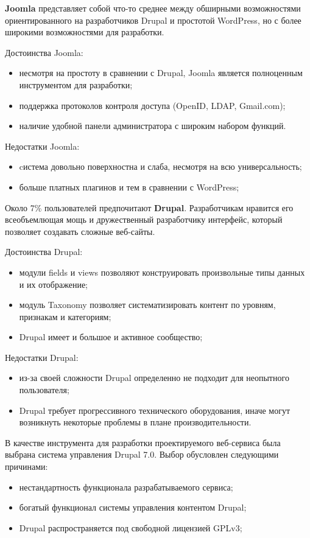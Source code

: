 \textbf{Joomla} представляет собой что-то среднее между обширными возможностями ориентированного на
разработчиков Drupal и простотой WordPress, но с более широкими возможностями для разработки.

Достоинства Joomla:
\begin{itemize}
\item
  несмотря на простоту в сравнении с Drupal, Joomla является полноценным инструментом для разработки;
\item
  поддержка протоколов контроля доступа (OpenID, LDAP, Gmail.com);
\item
  наличие удобной панели администратора с широким набором функций.
\end{itemize}

Недостатки Joomla:
\begin{itemize}
\item
  cистема довольно поверхностна и слаба, несмотря на всю универсальность;
\item
  больше платных плагинов и тем в сравнении с WordPress;
\end{itemize}

Около 7\% пользователей предпочитают \textbf{Drupal}. Разработчикам нравится его всеобъемлющая мощь
и дружественный разработчику интерфейс, который позволяет создавать сложные веб-сайты.

Достоинства Drupal:
\begin{itemize}
\item
  модули fields и views позволяют конструировать произвольные типы данных и их отображение;
\item
  модуль Taxonomy позволяет систематизировать контент по уровням, признакам и категориям;
\item
  Drupal имеет и большое и активное сообщество;
\end{itemize}

Недостатки Drupal:
\begin{itemize}
\item 
  из-за своей сложности Drupal определенно не подходит для неопытного пользователя;
\item
  Drupal требует прогрессивного технического оборудования,
  иначе могут возникнуть некоторые проблемы в плане производительности.
\end{itemize}

В качестве инструмента для разработки проектируемого веб-сервиса была выбрана система управления Drupal 7.0.
Выбор обусловлен следующими причинами:
\begin{itemize}
\item
  нестандартность функционала разрабатываемого сервиса;
\item
  богатый функционал системы управления контентом Drupal;
\item 
  Drupal распространяется под свободной лицензией GPLv3;
\end{itemize}  

